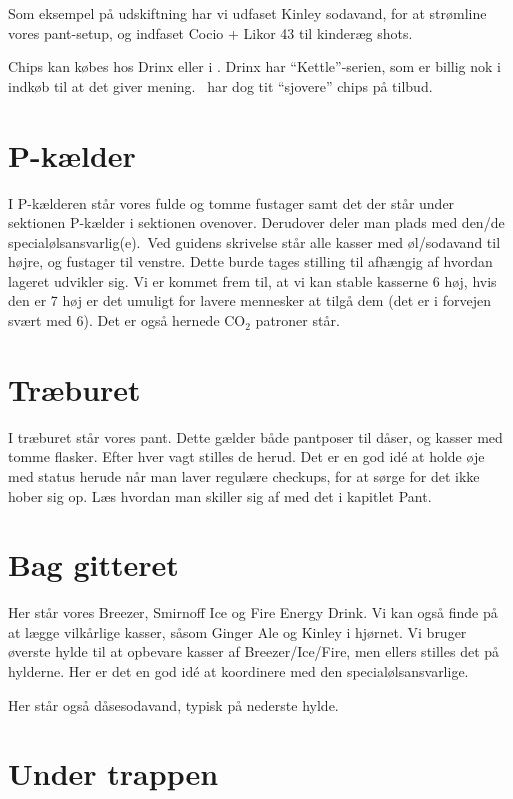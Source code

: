 Som eksempel på udskiftning har vi udfaset Kinley sodavand, for at strømline vores pant-setup, og indfaset Cocio + Likor 43 til kinderæg shots.

Chips kan købes hos Drinx eller i \foetex. Drinx har ``Kettle''-serien, som er billig nok i indkøb til at det giver mening. \foetex~har dog tit ``sjovere'' chips på tilbud.

\section{P-kælder}

I P-kælderen står vores fulde og tomme fustager samt det der står under sektionen P-kælder i sektionen ovenover. Derudover deler man plads med den/de specialølsansvarlig(e).\ 
Ved guidens skrivelse står alle kasser med øl/sodavand til højre, og fustager til venstre. Dette burde tages stilling til afhængig af hvordan lageret udvikler sig.
Vi er kommet frem til, at vi kan stable kasserne 6 høj, hvis den er 7 høj er det umuligt for lavere mennesker at tilgå dem (det er i forvejen svært med 6).
Det er også hernede CO$_2$ patroner står.


\section{Træburet}

I træburet står vores pant. Dette gælder både pantposer til dåser, og kasser med tomme flasker. Efter hver vagt stilles de herud. Det er en god idé at holde øje med status herude når man laver regulære checkups, for at sørge for det ikke hober sig op. Læs hvordan man skiller sig af med det i kapitlet Pant.

\section{Bag gitteret}

Her står vores Breezer, Smirnoff Ice og Fire Energy Drink. Vi kan også finde på at lægge vilkårlige kasser, såsom Ginger Ale og Kinley i hjørnet. Vi bruger øverste hylde til at opbevare kasser af Breezer/Ice/Fire, men ellers stilles det på hylderne. Her er det en god idé at koordinere med den specialølsansvarlige.

Her står også dåsesodavand, typisk på nederste hylde.

\section{Under trappen}

